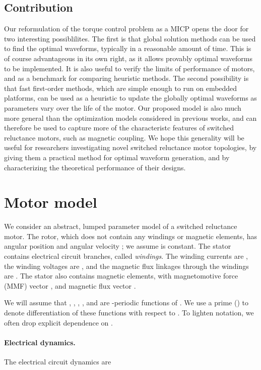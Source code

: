 \documentclass[11pt]{article}
\begin{document}
\subsection{Contribution}
Our reformulation of the torque control problem as a MICP opens the door for two
interesting possiblilites.
The first is that global solution methods can be used to find the optimal waveforms,
typically in a reasonable amount of time.
This is of course advantageous in its own right,
as it allows provably optimal waveforms to be implemented.
It is also useful to verify the limits of performance of motors,
and as a benchmark for comparing heuristic methods.
The second possibility is that fast first-order methods, 
which are simple enough to run on embedded platforms,
can be used as a heuristic to update the globally optimal waveforms as 
parameters vary over the life of the motor.
Our proposed model is also much more general than
the optimization models considered in previous works,
and can therefore be used to capture more of the characteristc features of
switched reluctance motors, such as magnetic coupling.
We hope this generality will be useful for researchers investigating
novel switched reluctance motor topologies,
by giving them a practical method for optimal waveform generation,
and by characterizing the theoretical performance of their designs.

\section{Motor model}
\label{s-model}
We consider an abstract, lumped parameter model of a switched reluctance motor.
The rotor, which does not contain any windings or magnetic elements,
has angular position  and angular velocity ;
we assume  is constant. 
The stator contains  electrical circuit branches, called {\it windings}.
The winding currents are ,
the winding voltages are ,
and the magnetic flux linkages through the windings are .
The stator also contains  magnetic elements,
with magnetomotive force (MMF) vector ,
and magnetic flux vector .

We will assume that 
, , , , and 
are -periodic functions of .
We use a prime () to denote differentiation of these functions with respect
to . 
To lighten notation, we often drop explicit dependence on .


\paragraph{Electrical dynamics.}
The electrical circuit dynamics are
\end{document}
